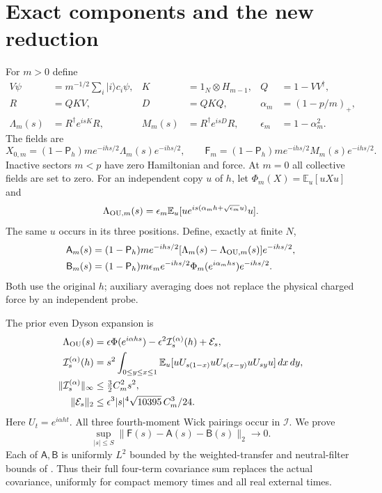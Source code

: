 \documentclass[11pt,a4paper]{article}
\newcommand{\EE}{\mathbb E}
\newcommand{\PP}{\mathsf P_h}
\newcommand{\MA}{\mathsf A}
\newcommand{\BB}{\mathsf B}
\newcommand{\FF}{\mathsf F}
\begin{document}
\section{Exact components and the new reduction}
For $m>0$ define
\begin{align}
 V\psi&=m^{-1/2}\sum_i|i\rangle c_i\psi,&
 K&=1_N\otimes H_{m-1},&Q&=1-VV^\dagger,\\
 R&=QKV,&D&=QKQ,&\alpha_m&=(1-p/m)_+,\\
 \Lambda_m(s)&=R^\dagger e^{isK}R,&
 M_m(s)&=R^\dagger e^{isD}R,&\epsilon_m&=1-\alpha_m^2.
\end{align}
The fields are
\begin{equation}
 X_{0,m}=(1-\PP)m e^{-ihs/2}\Lambda_m(s)e^{-ihs/2},\qquad
 \FF_m=(1-\PP)m e^{-ihs/2}M_m(s)e^{-ihs/2}.
\end{equation}
Inactive sectors $m<p$ have zero Hamiltonian and force. At $m=0$
all collective fields are set to zero.
For an independent copy $u$ of $h$, let $\Phi_m(X)=\EE_u[uXu]$ and
\begin{equation}
 \Lambda_{{\rm OU},m}(s)
 =\epsilon_m\EE_u[u e^{is(\alpha_mh+\sqrt{\epsilon_m}u)}u].
\end{equation}
The same $u$ occurs in its three positions. Define, exactly at finite $N$,
\begin{align}
 \MA_m(s)&=(1-\PP)m e^{-ihs/2}
          [\Lambda_m(s)-\Lambda_{{\rm OU},m}(s)]e^{-ihs/2},\\
 \BB_m(s)&=(1-\PP)m\epsilon_m e^{-ihs/2}
          \Phi_m(e^{i\alpha_mhs})e^{-ihs/2}.
\end{align}
Both use the original $h$; auxiliary averaging does not replace
the physical charged force by an independent probe.

The prior even Dyson expansion is
\begin{align}
 \Lambda_{\rm OU}(s)&=\epsilon\Phi(e^{i\alpha hs})
       -\epsilon^2\mathcal I_s^{(\alpha)}(h)+\mathcal E_s,\\
 \mathcal I_s^{(\alpha)}(h)&=s^2\int_{0\le y\le x\le1}
 \EE_u[uU_{s(1-x)}uU_{s(x-y)}uU_{sy}u]\,dx\,dy,\\
 \|\mathcal I_s^{(\alpha)}\|_\infty&\le\tfrac32 C_m^2s^2,\\
 \|\mathcal E_s\|_2&\le
 \epsilon^3|s|^4\sqrt{10395}\,C_m^3/24.
\end{align}
Here $U_t=e^{i\alpha ht}$. All three fourth-moment Wick pairings occur in $\mathcal I$.
We prove
\begin{equation}
 \boxed{\quad\sup_{|s|\le S}\|\FF(s)-\MA(s)-\BB(s)\|_2\to0.\quad}
 \label{eq:reduction}
\end{equation}
Each of $\MA,\BB$ is uniformly $L^2$ bounded by the weighted-transfer
and neutral-filter bounds of \cite{Uniform}. Thus their full
four-term covariance sum replaces the actual covariance, uniformly
for compact memory times and all real external times.
\end{document}

